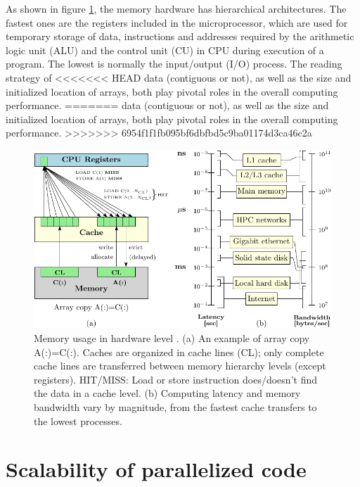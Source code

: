 As shown in figure \ref{fig:Memory}, the memory hardware has hierarchical
architectures. The fastest ones are the registers included in the
microprocessor, which are used for temporary storage of data, instructions
and addresses required by the arithmetic logic unit (ALU) and the
control unit (CU) in CPU during execution of a program. The lowest
is normally the input/output (I/O) process. The reading strategy of
<<<<<<< HEAD
data (contiguous or not), as well as the size and initialized location
of arrays, both play pivotal roles in the overall computing performance.
=======
data (contiguous or not), as well as the size and initialized location of arrays,
both play pivotal roles in the overall computing performance. 
>>>>>>> 6954f1f1fb095bf6dbfbd5c9ba01174d3ca46c2a

\begin{figure}[h]
\begin{centering}
\includegraphics{_figure/memory}
\par\end{centering}

\caption [Memory usage in hardware level]{Memory usage in hardware level \citep{LRZ-cours}. (a) An example
of array copy A(:)=C(:). Caches are organized in cache lines (CL);
only complete cache lines are transferred between memory hierarchy
levels (except registers). HIT/MISS: Load or store instruction does/doesn't
find the data in a cache level. (b) Computing latency and memory bandwidth
vary by magnitude, from the fastest cache transfers to the lowest
processes.\label{fig:Memory}}
\end{figure}



\section{Scalability of parallelized code}

